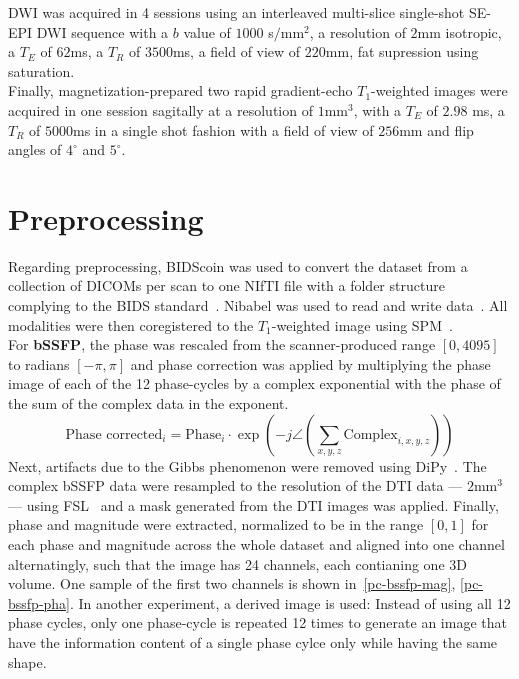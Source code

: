 DWI was acquired in 4 sessions using an interleaved multi-slice single-shot SE-EPI DWI sequence with a $b$ value of $1000$ s$/$mm$^2$, a resolution of $2$mm isotropic, a $T_E$ of $62$ms, a $T_R$ of $3500$ms, a field of view of $220$mm, fat supression using saturation. \\

Finally, magnetization-prepared two rapid gradient-echo $T_1$-weighted images were acquired in one session sagitally at a resolution of $1$mm$^3$, with a $T_E$ of $2.98$ ms, a $T_R$ of $5000$ms in a single shot fashion with a field of view of $256$mm and flip angles of $4^\circ$ and $5^\circ$. \\

\section{Preprocessing}
Regarding preprocessing, BIDScoin was used to convert the dataset from a collection of DICOMs per scan to one NIfTI file with a folder structure complying to the BIDS standard~\autocite{zwiers_bidscoin_2022, yarkoni_pybids_2019, gorgolewski_brain_2016}.
Nibabel was used to read and write data~\autocite{brett_nipynibabel_2024}.
All modalities were then coregistered to the $T_1$-weighted image using SPM~\autocite{friston_statistical_1994}. \\

For \textbf{bSSFP}, the phase was rescaled from the scanner-produced range $[0, 4095]$ to radians $[-\pi,\pi]$ and phase correction was applied by multiplying the phase image of each of the 12 phase-cycles by a complex exponential with the phase of the sum of the complex data in the exponent.
\[ \text{Phase corrected}_i = \text{Phase}_i \cdot \exp\left( -j \angle \left(\sum_{x, y, z} \text{Complex}_{i, x, y, z}\right) \right) \]
Next, artifacts due to the Gibbs phenomenon were removed using DiPy~\autocite{garyfallidis_dipy_2014}.
The complex bSSFP data were resampled to the resolution of the DTI data --- $2$mm$^3$ --- using FSL~\autocite{smith_advances_2004} and a mask generated from the DTI images was applied.
Finally, phase and magnitude were extracted, normalized to be in the range $[0, 1]$ for each phase and magnitude across the whole dataset and aligned into one channel alternatingly, such that the image has 24 channels, each contianing one 3D volume.
One sample of the first two channels is shown in~\ref{pc-bssfp-mag}, \ref{pc-bssfp-pha}.
In another experiment, a derived image is used: Instead of using all 12 phase cycles, only one phase-cycle is repeated 12 times to generate an image that have the information content of a single phase cylce only while having the same shape. \\



